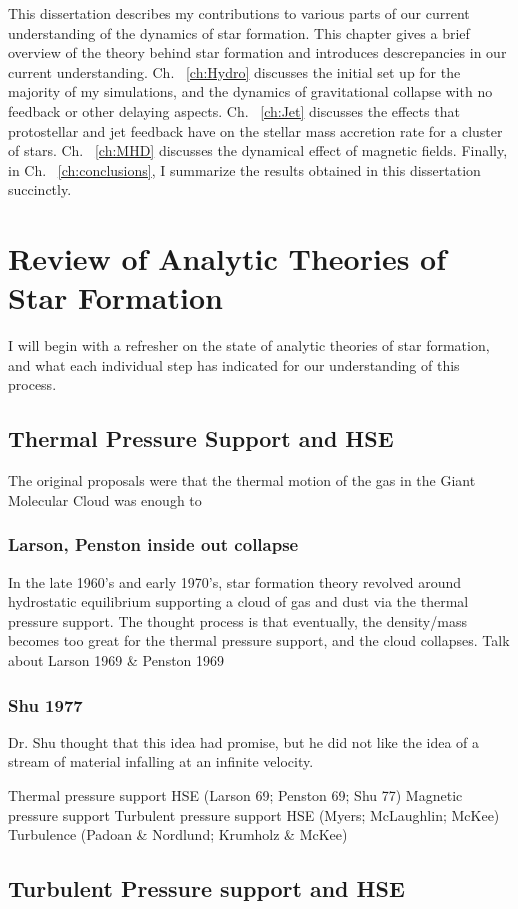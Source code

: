 \documentclass[../dissertation.tex]{subfiles}
\begin{document}
This dissertation describes my contributions to various parts of our current understanding of the dynamics of star formation. 
This chapter gives a brief overview of the theory behind star formation and introduces descrepancies in our current understanding. 
Ch. ~\ref{ch:Hydro} discusses the initial set up for the majority of my simulations, and the dynamics of gravitational collapse with no feedback or other delaying aspects.
Ch. ~\ref{ch:Jet} discusses the effects that protostellar and jet feedback have on the stellar mass accretion rate for a cluster of stars.
Ch. ~\ref{ch:MHD} discusses the dynamical effect of magnetic fields.
Finally, in Ch. ~\ref{ch:conclusions}, I summarize the results obtained in this dissertation succinctly.

%
\section{Review of Analytic Theories of Star Formation}
\label{sec:sf_review}
I will begin with a refresher on the state of analytic theories of star formation, and what each individual step has indicated for our understanding of this process.

\subsection{Thermal Pressure Support and HSE}
The original proposals were that the thermal motion of the gas in the Giant Molecular Cloud was enough to

\subsubsection{Larson, Penston inside out collapse}
In the late 1960's and early 1970's, star formation theory revolved around hydrostatic equilibrium supporting a cloud of gas and dust via the thermal pressure support. The thought process is that eventually, the density/mass becomes too great for the thermal pressure support, and the cloud collapses.
Talk about Larson 1969 \& Penston 1969

\subsubsection{Shu 1977}
\label{subsec:Shu_review}
Dr. Shu thought that this idea had promise, but he did not like the idea of a stream of material infalling at an infinite velocity. 


Thermal pressure support HSE (Larson 69; Penston 69; Shu 77)
Magnetic pressure support
Turbulent pressure support HSE (Myers; McLaughlin; McKee)
Turbulence (Padoan \& Nordlund; Krumholz \& McKee)

\subsection{Turbulent Pressure support and HSE}
\end{document}
